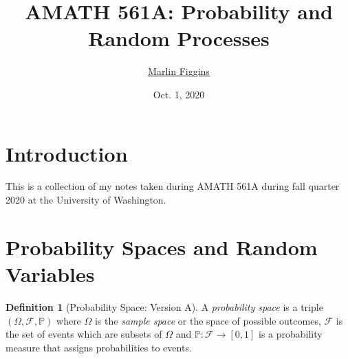 \documentclass[12pt]{article}
\title{\bfseries\huge{AMATH 561A: Probability and Random Processes}\vspace{-1ex}} \author{\href{marlinfiggins@gmail.com}{\Large{Marlin Figgins}}\vspace{-2ex}}
\date{\large{Oct. 1, 2020}}
\newcommand{\calF}{\mathcal{F}}
\newcommand{\Prob}{\mathbb{P}}
\theoremstyle{definition}
\newtheorem{defn}[thm]{Definition}
\theoremstyle{remark}
\numberwithin{equation}{section}
\begin{document}
\maketitle

	\section*{\hfill Introduction \hfill}

  This is a collection of my notes taken during AMATH 561A during fall quarter 2020 at the University of Washington.

  \thispagestyle{empty}

  \newpage
  \tableofcontents
  \thispagestyle{empty}
  \newpage

  \setcounter{page}{1}


  \section{Probability Spaces and Random Variables}%
  \label{sec:probability_spaces_and_random_variables}


  \begin{defn}[Probability Space: Version A]
    A \emph{probability space} is a triple $(\Omega, \calF, \Prob)$ where $\Omega$ is the \emph{sample space} or the space of possible outcomes, $\calF$ is the set of events which are subsets of $\Omega$ and $\Prob \colon \calF \to [0,1]$ is a probability measure that assigns probabilities to events.
 \end{defn} 
\end{document}
